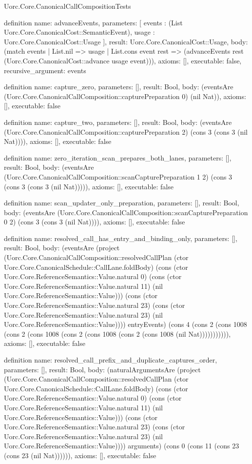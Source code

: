 \begin{lexlean}{Uorc.Core.CanonicalCallCompositionTests}
\begin{semanticmodule}
definition{
  name: advanceEvents,
  parameters: [
    events : (List Uorc.Core.CanonicalCost::SemanticEvent),
    usage : Uorc.Core.CanonicalCost::Usage
  ],
  result: Uorc.Core.CanonicalCost::Usage,
  body: (match events
    | List.nil => usage
    | List.cons event rest => (advanceEvents rest (Uorc.Core.CanonicalCost::advance usage event))),
  axioms: [],
  executable: false,
  recursive_argument: events
}

definition{
  name: capture_zero,
  parameters: [],
  result: Bool,
  body: (eventsAre (Uorc.Core.CanonicalCallComposition::capturePreparation 0) (nil Nat)),
  axioms: [],
  executable: false
}

definition{
  name: capture_two,
  parameters: [],
  result: Bool,
  body: (eventsAre (Uorc.Core.CanonicalCallComposition::capturePreparation 2) (cons 3 (cons 3 (nil Nat)))),
  axioms: [],
  executable: false
}

definition{
  name: zero_iteration_scan_prepares_both_lanes,
  parameters: [],
  result: Bool,
  body: (eventsAre (Uorc.Core.CanonicalCallComposition::scanCapturePreparation 1 2) (cons 3 (cons 3 (cons 3 (nil Nat))))),
  axioms: [],
  executable: false
}

definition{
  name: scan_updater_only_preparation,
  parameters: [],
  result: Bool,
  body: (eventsAre (Uorc.Core.CanonicalCallComposition::scanCapturePreparation 0 2) (cons 3 (cons 3 (nil Nat)))),
  axioms: [],
  executable: false
}

definition{
  name: resolved_call_has_entry_and_binding_only,
  parameters: [],
  result: Bool,
  body: (eventsAre (project (Uorc.Core.CanonicalCallComposition::resolvedCallPlan (ctor Uorc.Core.CanonicalSchedule::CallLane.foldBody) (cons (ctor Uorc.Core.ReferenceSemantics::Value.natural 0) (cons (ctor Uorc.Core.ReferenceSemantics::Value.natural 11) (nil Uorc.Core.ReferenceSemantics::Value))) (cons (ctor Uorc.Core.ReferenceSemantics::Value.natural 23) (cons (ctor Uorc.Core.ReferenceSemantics::Value.natural 23) (nil Uorc.Core.ReferenceSemantics::Value)))) entryEvents) (cons 4 (cons 2 (cons 1008 (cons 2 (cons 1008 (cons 2 (cons 1008 (cons 2 (cons 1008 (nil Nat))))))))))),
  axioms: [],
  executable: false
}

definition{
  name: resolved_call_prefix_and_duplicate_captures_order,
  parameters: [],
  result: Bool,
  body: (naturalArgumentsAre (project (Uorc.Core.CanonicalCallComposition::resolvedCallPlan (ctor Uorc.Core.CanonicalSchedule::CallLane.foldBody) (cons (ctor Uorc.Core.ReferenceSemantics::Value.natural 0) (cons (ctor Uorc.Core.ReferenceSemantics::Value.natural 11) (nil Uorc.Core.ReferenceSemantics::Value))) (cons (ctor Uorc.Core.ReferenceSemantics::Value.natural 23) (cons (ctor Uorc.Core.ReferenceSemantics::Value.natural 23) (nil Uorc.Core.ReferenceSemantics::Value)))) arguments) (cons 0 (cons 11 (cons 23 (cons 23 (nil Nat)))))),
  axioms: [],
  executable: false
}


\end{semanticmodule}
\end{lexlean}

